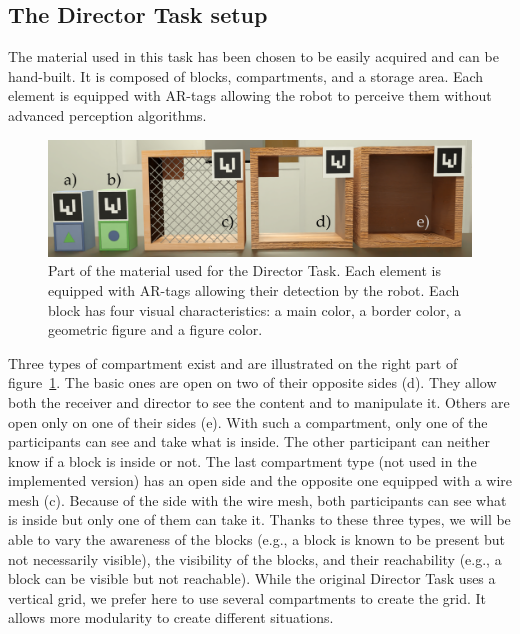 \subsection{The Director Task setup}

The material used in this task has been chosen to be easily acquired and can be hand-built. It is composed of blocks, compartments, and a storage area. Each element is equipped with AR-tags allowing the robot to perceive them without advanced perception algorithms.

\begin{figure}[ht!]
\centering
\includegraphics[width=\textwidth]{figures/chapter9/material.png}
\caption{\label{fig:chap9_material} Part of the material used for the Director Task. Each element is equipped with AR-tags allowing their detection by the robot. Each block has four visual characteristics: a main color, a border color, a geometric figure  and a figure color. }
\end{figure}

Three types of compartment exist and are illustrated on the right part of figure~\ref{fig:chap9_material}. The basic ones are open on two of their opposite sides (d). They allow both the receiver and director to see the content and to manipulate it. Others are open only on one of their sides (e). With such a compartment, only one of the participants can see and take what is inside. The other participant can neither know if a block is inside or not. The last compartment type (not used in the implemented version) has an open side and the opposite one equipped with a wire mesh (c). Because of the side with the wire mesh, both participants can see what is inside but only one of them can take it. Thanks to these three types, we will be able to vary the awareness of the blocks (e.g., a block is known to be present but not necessarily visible), the visibility of the blocks, and their reachability (e.g., a block can be visible but not reachable). While the original Director Task uses a vertical grid, we prefer here to use several compartments to create the grid. It allows more modularity to create different situations.

